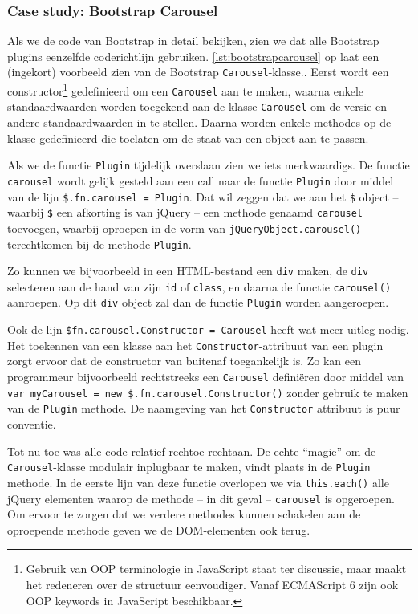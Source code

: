 \subsubsection{Case study: Bootstrap Carousel}

Als we de code van Bootstrap in detail bekijken, zien we dat alle Bootstrap 
plugins eenzelfde coderichtlijn gebruiken. \autoref{lst:bootstrapcarousel} op  
 laat een (ingekort) voorbeeld 
zien van de Bootstrap \texttt{Carousel}-klasse.\cite{bootscarrousel:online}. 
Eerst wordt een
constructor\footnote{Gebruik van OOP terminologie in JavaScript staat ter
discussie, maar maakt het redeneren over de structuur eenvoudiger. Vanaf
ECMAScript 6 zijn ook OOP keywords in JavaScript beschikbaar.} gedefinieerd om 
een
\texttt{Carousel} aan te maken, waarna enkele standaardwaarden worden toegekend
aan de klasse \texttt{Carousel} om de versie en andere standaardwaarden in te
stellen. Daarna worden enkele methodes op de klasse gedefinieerd die toelaten
om de staat van een object aan te passen.

Als we de functie \texttt{Plugin} tijdelijk overslaan zien we iets merkwaardigs.
De functie \texttt{carousel} wordt gelijk gesteld aan een call naar de functie
\texttt{Plugin} door middel van de lijn \lstinline|$.fn.carousel = Plugin|. Dat
wil zeggen dat we aan het \texttt{\$} object -- waarbij \texttt{\$} een
afkorting is van jQuery -- een methode genaamd \texttt{carousel} toevoegen,
waarbij oproepen in de vorm van \lstinline|jQueryObject.carousel()| terechtkomen
bij de methode \texttt{Plugin}.

Zo kunnen we bijvoorbeeld in een HTML-bestand een \texttt{div} maken, de
\texttt{div} selecteren aan de hand van zijn \texttt{id} of \texttt{class}, en
daarna de functie \texttt{carousel()} aanroepen. Op dit \texttt{div} object zal
dan de functie \texttt{Plugin} worden aangeroepen.

Ook de lijn \lstinline|$fn.carousel.Constructor = Carousel| heeft wat meer
uitleg nodig. Het toekennen van een klasse aan het
\texttt{Constructor}-attribuut van een plugin zorgt ervoor dat de constructor
van buitenaf toegankelijk is. Zo kan een programmeur bijvoorbeeld rechtstreeks
een \texttt{Carousel} definiëren door middel van 
\texttt{var myCarousel = new \$.fn.carousel.Constructor()} zonder gebruik te 
maken van de \texttt{Plugin}
methode. De naamgeving van het \texttt{Constructor} attribuut is puur conventie.

Tot nu toe was alle code relatief rechtoe rechtaan. De echte ``magie'' om de
\texttt{Carousel}-klasse modulair inplugbaar te maken, vindt plaats in de
\texttt{Plugin} methode. In de eerste lijn van deze functie overlopen we via
\lstinline|this.each()| alle jQuery elementen waarop de methode -- in dit geval
-- \texttt{carousel} is opgeroepen. Om ervoor te zorgen dat we verdere methodes
kunnen schakelen aan de oproepende methode geven we de DOM-elementen ook
terug\cite{jQueryChaining:online}.


